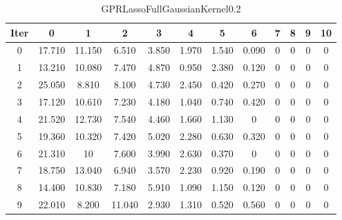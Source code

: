 \begin{table}
	\begin{center}
		\begin{tabular}{|c|c|c|c|c|c|c|c|c|c|c|c|}
			\hline
			Iter & 0 & 1 & 2 & 3 & 4 & 5 & 6 & 7 & 8 & 9 & 10 \\
			\hline
			0 & 17.710 & 11.150 & 6.510 & 3.850 & 1.970 & 1.540 & 0.090 & 0 & 0 & 0 & 0 \\
			\hline
			1 & 13.210 & 10.080 & 7.470 & 4.870 & 0.950 & 2.380 & 0.120 & 0 & 0 & 0 & 0 \\
			\hline
			2 & 25.050 & 8.810 & 8.100 & 4.730 & 2.450 & 0.420 & 0.270 & 0 & 0 & 0 & 0 \\
			\hline
			3 & 17.120 & 10.610 & 7.230 & 4.180 & 1.040 & 0.740 & 0.420 & 0 & 0 & 0 & 0 \\
			\hline
			4 & 21.520 & 12.730 & 7.540 & 4.460 & 1.660 & 1.130 & 0 & 0 & 0 & 0 & 0 \\
			\hline
			5 & 19.360 & 10.320 & 7.420 & 5.020 & 2.280 & 0.630 & 0.320 & 0 & 0 & 0 & 0 \\
			\hline
			6 & 21.310 & 10 & 7.600 & 3.990 & 2.630 & 0.370 & 0 & 0 & 0 & 0 & 0 \\
			\hline
			7 & 18.750 & 13.040 & 6.940 & 3.570 & 2.230 & 0.920 & 0.190 & 0 & 0 & 0 & 0 \\
			\hline
			8 & 14.400 & 10.830 & 7.180 & 5.910 & 1.090 & 1.150 & 0.120 & 0 & 0 & 0 & 0 \\
			\hline
			9 & 22.010 & 8.200 & 11.040 & 2.930 & 1.310 & 0.520 & 0.560 & 0 & 0 & 0 & 0 \\
			\hline
		\end{tabular}
	\end{center}
	\caption{GPRLassoFullGaussianKernel0.2}
\end{table}